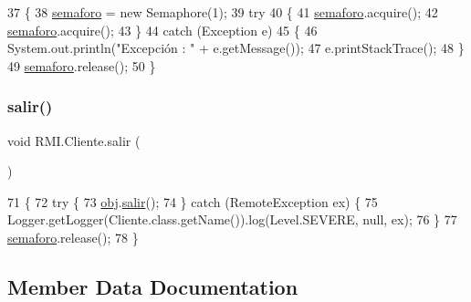 \begin{DoxyCode}
37     \{
38         \mbox{\hyperlink{class_r_m_i_1_1_cliente_aded0f4d7b773e89ec8c162cf94c83504}{semaforo}} = \textcolor{keyword}{new} Semaphore(1);
39         \textcolor{keywordflow}{try}
40         \{
41             \mbox{\hyperlink{class_r_m_i_1_1_cliente_aded0f4d7b773e89ec8c162cf94c83504}{semaforo}}.acquire();
42             \mbox{\hyperlink{class_r_m_i_1_1_cliente_aded0f4d7b773e89ec8c162cf94c83504}{semaforo}}.acquire();
43         \}
44         \textcolor{keywordflow}{catch} (Exception e)
45         \{
46             System.out.println(\textcolor{stringliteral}{"Excepción : "} + e.getMessage());
47             e.printStackTrace();
48         \}
49         \mbox{\hyperlink{class_r_m_i_1_1_cliente_aded0f4d7b773e89ec8c162cf94c83504}{semaforo}}.release();
50     \}
\end{DoxyCode}
\mbox{\label{class_r_m_i_1_1_cliente_ae6ed71195a80194555ce07416ca64406}} 
\subsubsection{\texorpdfstring{salir()}{salir()}}
{\footnotesize\ttfamily void R\+M\+I.\+Cliente.\+salir (\begin{DoxyParamCaption}{ }\end{DoxyParamCaption})\hspace{0.3cm}{\ttfamily [inline]}}


\begin{DoxyCode}
71     \{
72         \textcolor{keywordflow}{try} \{
73             \mbox{\hyperlink{class_r_m_i_1_1_cliente_ac0b62b87dd4c8edc00a335d7f029f8fa}{obj}}.\mbox{\hyperlink{interface_r_m_i_1_1_interface_saluda_a9bfad049387b9c751039d6c796f30db6}{salir}}();
74         \} \textcolor{keywordflow}{catch} (RemoteException ex) \{
75             Logger.getLogger(Cliente.class.getName()).log(Level.SEVERE, null, ex);
76         \}
77         \mbox{\hyperlink{class_r_m_i_1_1_cliente_aded0f4d7b773e89ec8c162cf94c83504}{semaforo}}.release();
78     \}
\end{DoxyCode}


\subsection{Member Data Documentation}
\mbox{\label{class_r_m_i_1_1_cliente_ac0b62b87dd4c8edc00a335d7f029f8fa}} 
